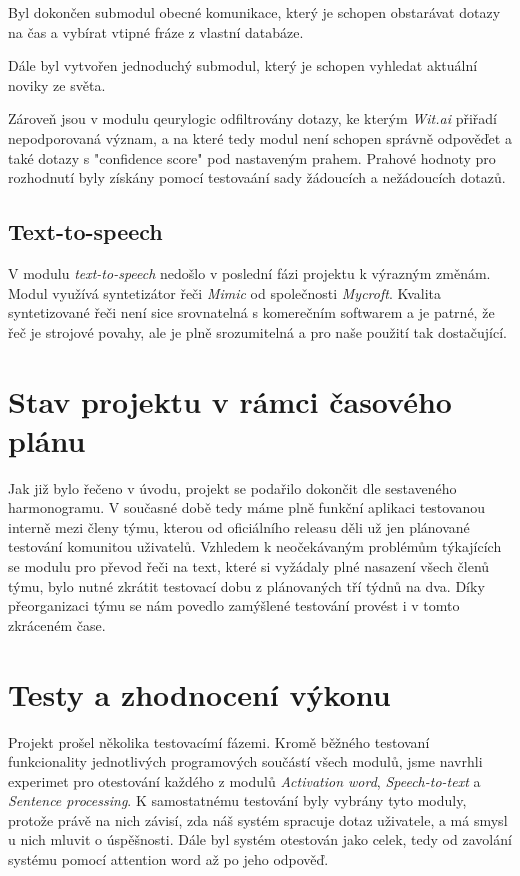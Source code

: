 \documentclass[12pt,a4paper]{article}
\begin{document}
Byl dokončen submodul obecné komunikace, který je schopen obstarávat dotazy na čas a vybírat vtipné fráze z vlastní databáze.

Dále byl vytvořen jednoduchý submodul, který je schopen vyhledat aktuální noviky ze světa.

Zároveň jsou v modulu qeurylogic odfiltrovány dotazy, ke kterým \textit{Wit.ai} přiřadí nepodporovaná význam, a na které tedy  modul není schopen správně odpověďet a také dotazy s "confidence score" pod nastaveným prahem. Prahové hodnoty pro rozhodnutí byly získány pomocí testovaání sady žádoucích a nežádoucích dotazů.

\subsection{Text-to-speech}
V modulu \textit{text-to-speech} nedošlo v poslední fázi projektu k výrazným změnám. Modul využívá syntetizátor řeči \textit{Mimic} od společnosti \textit{Mycroft}. 
Kvalita syntetizované řeči není sice srovnatelná s komerečním softwarem a je patrné, že řeč je strojové povahy, ale je plně srozumitelná a pro naše použití tak dostačující.


\section{Stav projektu v rámci časového plánu}
Jak již bylo řečeno v úvodu, projekt se podařilo dokončit dle sestaveného harmonogramu. V současné době tedy máme plně funkční aplikaci testovanou interně mezi členy týmu, kterou od oficiálního releasu děli už jen plánované testování komunitou uživatelů. Vzhledem k neočekávaným problémům týkajících se modulu pro převod řeči na text, které si vyžádaly plné nasazení všech členů týmu, bylo nutné zkrátit testovací dobu z plánovaných tří týdnů na dva. Díky přeorganizaci týmu se nám povedlo zamýšlené testování provést i v tomto zkráceném čase.

\section{Testy a zhodnocení výkonu}
Projekt prošel několika testovacímí fázemi. Kromě běžného testovaní funkcionality jednotlivých programových součástí všech modulů, jsme navrhli experimet pro otestování každého z modulů \textit{Activation word}, \textit{Speech-to-text} a \textit{Sentence processing}. K samostatnému testování byly vybrány tyto moduly, protože právě na nich závisí, zda náš systém spracuje dotaz uživatele, a má smysl u nich mluvit o úspěšnosti. Dále byl systém otestován jako celek, tedy od zavolání systému pomocí attention word až po jeho odpověď.
\end{document}
